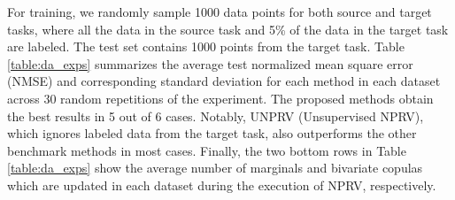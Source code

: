 \documentclass{article}
\begin{document}
For training, we randomly sample 1000 data points for both source and target
tasks, where all the data in the source task and 5\% of the data in the target
task are labeled.  The test set contains 1000 points from the target task.
Table \ref{table:da_exps} summarizes the average test normalized mean square
error (NMSE) and corresponding standard deviation for each method in each
dataset across 30 random repetitions of the experiment.  The proposed methods
obtain the best results in 5 out of 6 cases. Notably, \textsc{UNPRV}
(Unsupervised \textsc{NPRV}), which ignores labeled data from the target task,
also outperforms the other benchmark methods in most cases.  Finally, the two
bottom rows in Table \ref{table:da_exps} show the average number of marginals
and bivariate copulas which are updated in each dataset during the execution of
\textsc{NPRV}, respectively.
\end{document}
